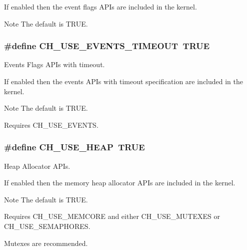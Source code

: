 If enabled then the event flags A\+P\+Is are included in the kernel.

\begin{DoxyNote}{Note}
The default is {\ttfamily T\+R\+U\+E}. 
\end{DoxyNote}
\hypertarget{group__config_ga64a6ad752750f42fe2474d3e7f191a71}{}
\subsubsection[{C\+H\+\_\+\+U\+S\+E\+\_\+\+E\+V\+E\+N\+T\+S\+\_\+\+T\+I\+M\+E\+O\+U\+T}]{\setlength{\rightskip}{0pt plus 5cm}\#define C\+H\+\_\+\+U\+S\+E\+\_\+\+E\+V\+E\+N\+T\+S\+\_\+\+T\+I\+M\+E\+O\+U\+T~T\+R\+U\+E}\label{group__config_ga64a6ad752750f42fe2474d3e7f191a71}


Events Flags A\+P\+Is with timeout. 

If enabled then the events A\+P\+Is with timeout specification are included in the kernel.

\begin{DoxyNote}{Note}
The default is {\ttfamily T\+R\+U\+E}. 

Requires {\ttfamily C\+H\+\_\+\+U\+S\+E\+\_\+\+E\+V\+E\+N\+T\+S}. 
\end{DoxyNote}
\hypertarget{group__config_gaaeb266ab6131572f1d8f164bddf2da3f}{}
\subsubsection[{C\+H\+\_\+\+U\+S\+E\+\_\+\+H\+E\+A\+P}]{\setlength{\rightskip}{0pt plus 5cm}\#define C\+H\+\_\+\+U\+S\+E\+\_\+\+H\+E\+A\+P~T\+R\+U\+E}\label{group__config_gaaeb266ab6131572f1d8f164bddf2da3f}


Heap Allocator A\+P\+Is. 

If enabled then the memory heap allocator A\+P\+Is are included in the kernel.

\begin{DoxyNote}{Note}
The default is {\ttfamily T\+R\+U\+E}. 

Requires {\ttfamily C\+H\+\_\+\+U\+S\+E\+\_\+\+M\+E\+M\+C\+O\+R\+E} and either {\ttfamily C\+H\+\_\+\+U\+S\+E\+\_\+\+M\+U\+T\+E\+X\+E\+S} or {\ttfamily C\+H\+\_\+\+U\+S\+E\+\_\+\+S\+E\+M\+A\+P\+H\+O\+R\+E\+S}. 

Mutexes are recommended. 
\end{DoxyNote}
\hypertarget{group__config_ga6cf1736db681617019f96c4c209d2716}{}
